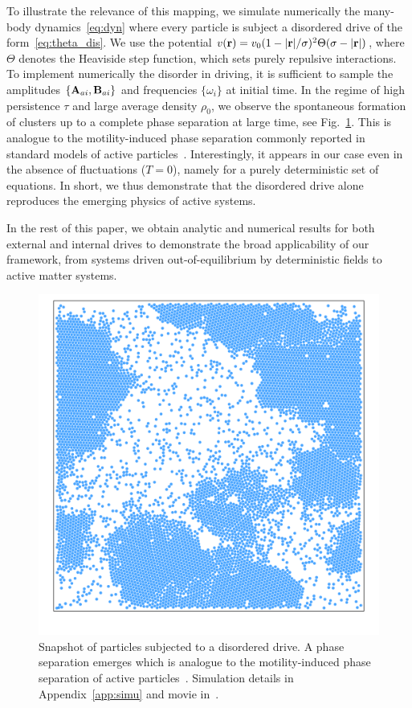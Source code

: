 \documentclass[superscriptaddress, twocolumn, prx, longbibliography, nofootinbib]{revtex4-1}
\begin{document}
To illustrate the relevance of this mapping, we simulate numerically the many-body dynamics~\eqref{eq:dyn} where every particle is subject a disordered drive of the form~\eqref{eq:theta_dis}. We use the potential $v({\bf r})=v_0(1-|{\bf r}|/\sigma)^2\Theta(\sigma-|{\bf r}|)$, where $\Theta$ denotes the Heaviside step function, which sets purely repulsive interactions. To implement numerically the disorder in driving, it is sufficient to sample the amplitudes $\{{\bf A}_{ai}, {\bf B}_{ai}\}$ and frequencies $\{\omega_i\}$ at initial time. In the regime of high persistence $\tau$ and large average density $\rho_0$, we observe the spontaneous formation of clusters up to a complete phase separation at large time, see Fig.~\ref{fig0}. This is analogue to the motility-induced phase separation commonly reported in standard models of active particles~\cite{Tailleur2008, Cates2015}. Interestingly, it appears in our case even in the absence of fluctuations ($T=0$), namely for a purely deterministic set of equations. In short, we thus demonstrate that the disordered drive alone reproduces the emerging physics of active systems. 


In the rest of this paper, we obtain analytic and numerical results for both external and internal drives to demonstrate the broad applicability of our framework, from systems driven out-of-equilibrium by deterministic fields to active matter systems. 


\begin{figure}
	\centering
	\includegraphics[width=.8\columnwidth]{fig0.pdf}
	\caption{\label{fig0}
		Snapshot of particles subjected to a disordered drive. A phase separation emerges which is analogue to the motility-induced phase separation of active particles~\cite{Tailleur2008, Cates2015}. Simulation details in Appendix~\ref{app:simu} and movie in~\cite{movie}.
	}
\end{figure}
\end{document}
